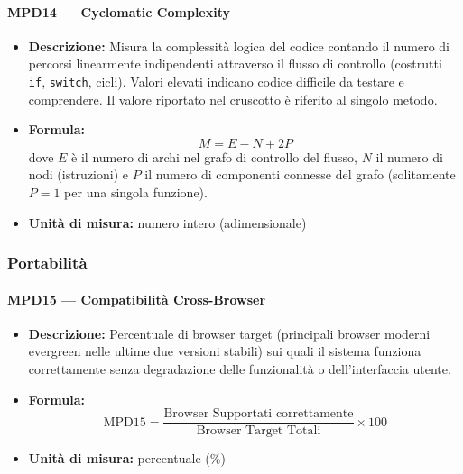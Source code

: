 \documentclass[a4paper,12pt]{article}
\begin{document}
\paragraph{MPD14 --- Cyclomatic Complexity}
\begin{itemize}
    \item \textbf{Descrizione:} Misura la complessità logica del codice contando il numero di percorsi linearmente indipendenti attraverso il flusso di controllo (costrutti \texttt{if}, \texttt{switch}, cicli). Valori elevati indicano codice difficile da testare e comprendere. Il valore riportato nel cruscotto è riferito al singolo metodo.
    \item \textbf{Formula:}
    $$M = E - N + 2P$$
    dove $E$ è il numero di archi nel grafo di controllo del flusso, $N$ il numero di nodi (istruzioni) e $P$ il numero di componenti connesse del grafo (solitamente $P = 1$ per una singola funzione).
    \item \textbf{Unità di misura:} numero intero (adimensionale)
\end{itemize}

\subsubsection{Portabilità}

\paragraph{MPD15 --- Compatibilità Cross-Browser}
\begin{itemize}
    \item \textbf{Descrizione:} Percentuale di browser target (principali browser moderni evergreen nelle ultime due versioni stabili) sui quali il sistema funziona correttamente senza degradazione delle funzionalità o dell'interfaccia utente.
    \item \textbf{Formula:}
    $$\text{MPD15} = \frac{\text{Browser Supportati correttamente}}{\text{Browser Target Totali}} \times 100$$
    \item \textbf{Unità di misura:} percentuale (\%)
\end{itemize}
\end{document}
